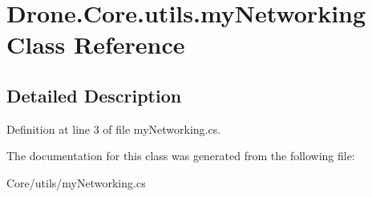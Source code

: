\hypertarget{class_drone_1_1_core_1_1utils_1_1my_networking}{}\section{Drone.\+Core.\+utils.\+my\+Networking Class Reference}
\label{class_drone_1_1_core_1_1utils_1_1my_networking}


\subsection{Detailed Description}


Definition at line 3 of file my\+Networking.\+cs.



The documentation for this class was generated from the following file\+:\begin{DoxyCompactItemize}
\item 
Core/utils/my\+Networking.\+cs\end{DoxyCompactItemize}
